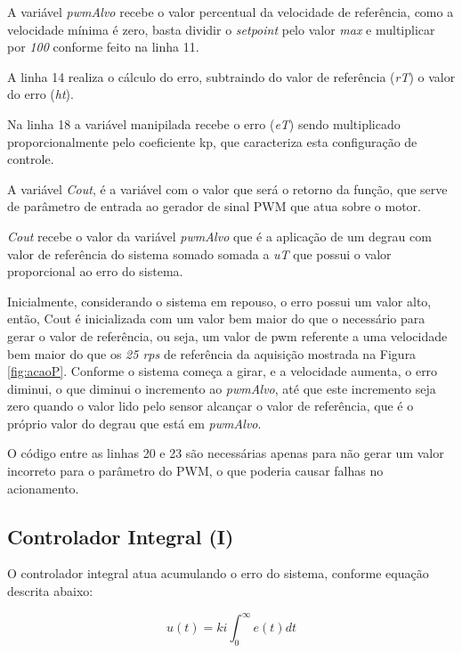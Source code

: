 A variável \emph{pwmAlvo} recebe o valor percentual da velocidade de referência, como a velocidade mínima é zero, basta dividir o \emph{setpoint} pelo valor \emph{max} e multiplicar por \emph{100} conforme feito na linha 11.


A linha 14 realiza o cálculo do erro, subtraindo do valor de referência (\emph{rT}) o valor do erro (\emph{ht}).

Na linha 18 a variável manipilada recebe o erro (\emph{eT}) sendo multiplicado proporcionalmente pelo coeficiente kp, que caracteriza esta configuração de controle.

A variável \emph{Cout}, é a variável com o valor que será o retorno da função, que serve de parâmetro de entrada ao gerador de sinal PWM que atua sobre o motor.

\emph{Cout} recebe o valor da variável \emph{pwmAlvo} que é a aplicação de um degrau com valor de referência do sistema somado somada a \emph{uT} que possui o valor proporcional ao erro do sistema. 

Inicialmente, considerando o sistema em repouso, o erro possui um valor alto, então, Cout é inicializada com um valor bem maior do que o necessário para gerar o valor de referência, ou seja, um valor de pwm referente a uma velocidade bem maior do que os \emph{25 rps} de referência da aquisição mostrada na Figura \ref{fig:acaoP}. Conforme o sistema começa a girar, e a velocidade aumenta, o erro diminui, o que diminui o incremento ao \emph{pwmAlvo}, até que este incremento seja zero quando o valor lido pelo sensor alcançar o valor de referência, que é o próprio valor do degrau que está em \emph{pwmAlvo}.

O código entre as linhas 20 e 23 são necessárias apenas para não gerar um valor incorreto para o parâmetro do PWM, o que poderia causar falhas no acionamento. 










\subsection{ Controlador Integral (I) }

O controlador integral atua acumulando o erro do sistema, conforme equação descrita abaixo:


\begin{equation}
u(t) = ki \int_{0}^{\infty} e(t) dt
\end{equation}


